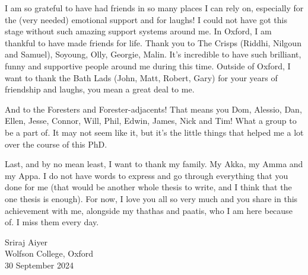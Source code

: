\documentclass[a4paper, nobind]{templates/ociamthesis}
\begin{document}
\begin{romanpages}
\begin{acknowledgements}
 \hfill\break
 I am so grateful to have had friends in so many places I can rely on, especially for the (very needed) emotional support and for laughs! I could not have got this stage without such amazing support systems around me. In Oxford, I am thankful to have made friends for life. Thank you to The Crisps (Riddhi, Nilgoun and Samuel), Soyoung, Olly, Georgie, Malin. It's incredible to have such brilliant, funny and supportive people around me during this time. Outside of Oxford, I want to thank the Bath Lads (John, Matt, Robert, Gary) for your years of friendship and laughs, you mean a great deal to me.

 \hfill\break
 And to the Foresters and Forester-adjacents! That means you Dom, Alessio, Dan, Ellen, Jesse, Connor, Will, Phil, Edwin, James, Nick and Tim! What a group to be a part of. It may not seem like it, but it's the little things that helped me a lot over the course of this PhD.

 \hfill\break
 Last, and by no mean least, I want to thank my family. My Akka, my Amma and my Appa. I do not have words to express and go through everything that you done for me (that would be another whole thesis to write, and I think that the one thesis is enough). For now, I love you all so very much and you share in this achievement with me, alongside my thathas and paatis, who I am here because of. I miss them every day.

 \begin{flushright}
 Sriraj Aiyer\\
 Wolfson College, Oxford \\
 30 September 2024
 \end{flushright}
\end{acknowledgements}






\end{romanpages}
\end{document}
